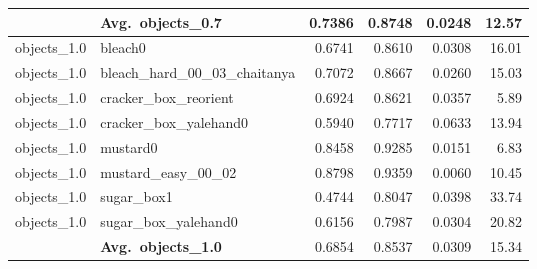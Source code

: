 \begin{longtable}{llrrrr}
  \cmidrule{2-6}
  & \textbf{Avg.~objects_0.7} & 0.7386 & 0.8748 & 0.0248 & 12.57 \\
  \midrule
  objects_1.0 & bleach0 & 0.6741 & 0.8610 & 0.0308 & 16.01 \\
  objects_1.0 & bleach\_hard\_00\_03\_chaitanya & 0.7072 & 0.8667 & 0.0260 & 15.03 \\
  objects_1.0 & cracker\_box\_reorient & 0.6924 & 0.8621 & 0.0357 & 5.89 \\
  objects_1.0 & cracker\_box\_yalehand0 & 0.5940 & 0.7717 & 0.0633 & 13.94 \\
  objects_1.0 & mustard0 & 0.8458 & 0.9285 & 0.0151 & 6.83 \\
  objects_1.0 & mustard\_easy\_00\_02 & 0.8798 & 0.9359 & 0.0060 & 10.45 \\
  objects_1.0 & sugar\_box1 & 0.4744 & 0.8047 & 0.0398 & 33.74 \\
  objects_1.0 & sugar\_box\_yalehand0 & 0.6156 & 0.7987 & 0.0304 & 20.82 \\
  \cmidrule{2-6}
  & \textbf{Avg.~objects_1.0} & 0.6854 & 0.8537 & 0.0309 & 15.34 \\
  \midrule
\bottomrule
\end{longtable}